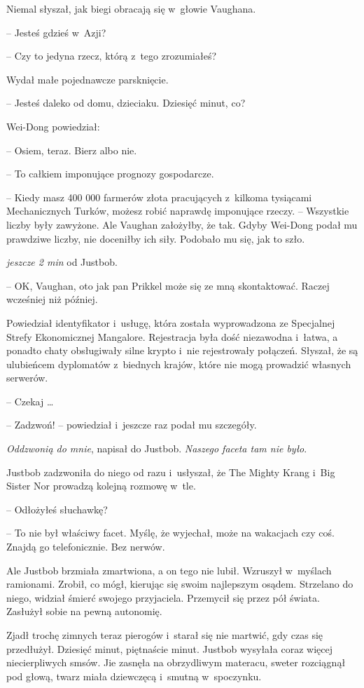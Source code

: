 \documentclass[oneside,polish,11pt,rmheadings]{mwbk}
\begin{document}
Niemal słyszał, jak biegi obracają się w~głowie Vaughana. 

-- Jesteś gdzieś w~Azji?

-- Czy to jedyna rzecz, którą z~tego zrozumiałeś?

Wydał małe pojednawcze parsknięcie.

 -- Jesteś daleko od domu, dzieciaku. Dziesięć minut, co?

Wei-Dong powiedział: 

-- Osiem, teraz. Bierz albo nie.

-- To całkiem imponujące prognozy gospodarcze.

-- Kiedy masz 400 000 farmerów złota pracujących z~kilkoma tysiącami Mechanicznych Turków, możesz robić naprawdę imponujące rzeczy. -- Wszystkie liczby były zawyżone. Ale Vaughan założyłby, że tak. Gdyby Wei-Dong podał mu prawdziwe liczby, nie doceniłby ich siły. Podobało mu się, jak to szło.

\textit{jeszcze 2 min} od Justbob.

-- OK, Vaughan, oto jak pan Prikkel może się ze mną skontaktować. Raczej wcześniej niż później. 

Powiedział identyfikator i~usługę, która została wyprowadzona ze Specjalnej Strefy Ekonomicznej Mangalore. Rejestracja była dość niezawodna i~łatwa, a ponadto chaty obsługiwały silne krypto i~nie rejestrowały połączeń. Słyszał, że są ulubieńcem dyplomatów z~biednych krajów, które nie mogą prowadzić własnych serwerów.

-- Czekaj \ldots  

-- Zadzwoń! -- powiedział i~jeszcze raz podał mu szczegóły.

\textit{Oddzwonią do mnie}, napisał do Justbob. \textit{Naszego faceta tam nie było}.

Justbob zadzwoniła do niego od razu i~usłyszał, że The Mighty Krang i~Big Sister Nor prowadzą kolejną rozmowę w~tle. 

-- Odłożyłeś słuchawkę? 

-- To nie był właściwy facet. Myślę, że wyjechał, może na wakacjach czy coś. Znajdą go telefonicznie. Bez nerwów. 

Ale Justbob brzmiała zmartwiona, a on tego nie lubił. Wzruszył w~myślach ramionami. Zrobił, co mógł, kierując się swoim najlepszym osądem. Strzelano do niego, widział śmierć swojego przyjaciela. Przemycił się przez pół świata. Zasłużył sobie na pewną autonomię.

Zjadł trochę zimnych teraz pierogów i~starał się nie martwić, gdy czas się przedłużył. Dziesięć minut, piętnaście minut. Justbob wysyłała coraz więcej niecierpliwych smsów. Jie zasnęła na obrzydliwym materacu, sweter rozciągnął pod głową, twarz miała dziewczęcą i~smutną w~spoczynku.
\end{document}
